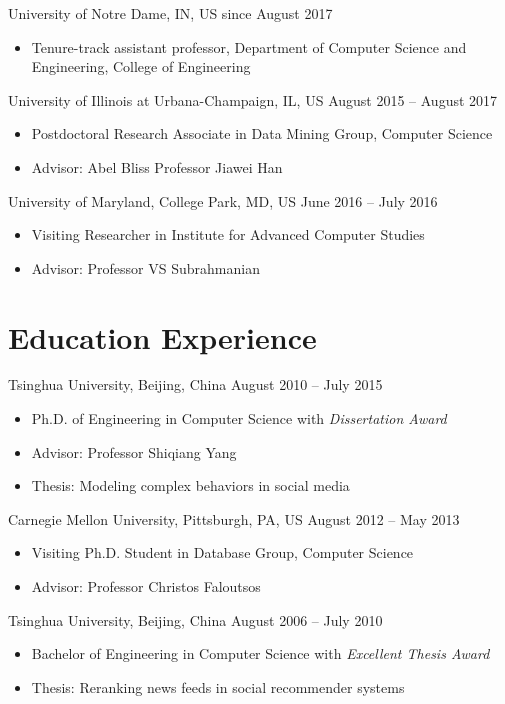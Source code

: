 \documentclass[margin, 9pt]{res}
\begin{document}
\begin{resume}
{University of Notre Dame, IN, US} \hfill{since August 2017}
\begin{itemize}
	\item Tenure-track assistant professor, Department of Computer Science and Engineering, College of Engineering
\end{itemize}
\vspace{-0.1in}
{University of Illinois at Urbana-Champaign, IL, US} \hfill{August 2015 -- August 2017}
\begin{itemize}
	\item Postdoctoral Research Associate in Data Mining Group, Computer Science
	\item Advisor: Abel Bliss Professor Jiawei Han
\end{itemize}
\vspace{-0.1in}
{University of Maryland, College Park, MD, US} \hfill{June 2016 -- July 2016}
\begin{itemize}
	\item Visiting Researcher in Institute for Advanced Computer Studies
	\item Advisor: Professor VS Subrahmanian
\end{itemize}


\section{Education Experience}

{Tsinghua University, Beijing, China} \hfill{August 2010 -- July 2015}
\begin{itemize}
\item Ph.D. of Engineering in Computer Science with \textit{Dissertation Award}
\item Advisor: Professor Shiqiang Yang
\item Thesis: Modeling complex behaviors in social media
\end{itemize}
\vspace{-0.1in}
{Carnegie Mellon University, Pittsburgh, PA, US} \hfill{August 2012 -- May 2013}
\begin{itemize}
\item Visiting Ph.D. Student in Database Group, Computer Science
\item Advisor: Professor Christos Faloutsos
\end{itemize}
\vspace{-0.1in}
{Tsinghua University, Beijing, China} \hfill{August 2006 -- July 2010}
\begin{itemize}
\item Bachelor of Engineering in Computer Science with \textit{Excellent Thesis Award}
\item Thesis: Reranking news feeds in social recommender systems
\end{itemize}


\end{resume}
\end{document}
